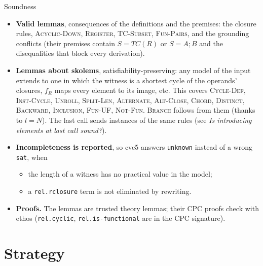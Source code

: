 \documentclass[aspectratio=169]{beamer}
\newcommand{\sm}[1]{\texttt{#1}}
\newcommand{\TC}{\mathit{TC}}
\newcommand{\rn}[1]{\textsc{#1}}
\begin{document}
\begin{frame}{Soundness}
  \small
  \begin{itemize}
    \item \textbf{Valid lemmas}, consequences of the definitions and the premises: the closure
      rules, \rn{Acyclic-Down}, \rn{Register}, \rn{TC-Subset}, \rn{Fun-Pairs}, and the grounding
      conflicts (their premises contain $S = \TC(R)$ or $S = A;B$ and the disequalities that
      block every derivation).
    \item \textbf{Lemmas about skolems}, satisfiability-preserving: any model of the input
      extends to one in which the witness is a shortest cycle of the operands' closures,
      $f_R$ maps every element to its image, etc. This covers \rn{Cycle-Def}, \rn{Inst-Cycle},
      \rn{Unroll}, \rn{Split-Len}, \rn{Alternate}, \rn{Alt-Close}, \rn{Chord}, \rn{Distinct},
      \rn{Backward}, \rn{Inclusion}, \rn{Fun-UF}, \rn{Not-Fun}. \rn{Branch} follows from them
      (thanks to $l = N$). The last call sends instances of the same rules (see \emph{Is
      introducing elements at last call sound?}).
    \item \textbf{Incompleteness is reported}, so cvc5 answers \sm{unknown} instead of a wrong
      \sm{sat}, when
      \begin{itemize}
        \item the length of a witness has no practical value in the model;
        \item a \sm{rel.rclosure} term is not eliminated by rewriting.
      \end{itemize}
    \item \textbf{Proofs.} The lemmas are trusted theory lemmas; their CPC proofs check with
      ethos (\sm{rel.cyclic}, \sm{rel.is-functional} are in the CPC signature).
  \end{itemize}
\end{frame}

\section{Strategy}
\end{document}
